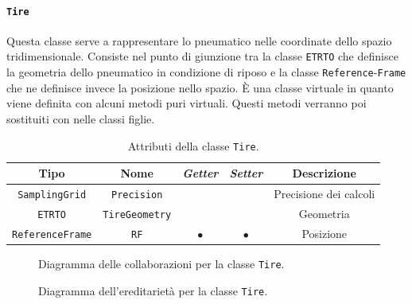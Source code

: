 \paragraph{\texttt{Tire}}
Questa classe serve a rappresentare lo pneumatico nelle coordinate dello spazio tridimensionale. Consiste nel punto di giunzione tra la classe \texttt{ETRTO} che definisce la geometria dello pneumatico in condizione di riposo e la classe \texttt{Reference}-\texttt{Frame} che ne definisce invece la posizione nello spazio. È una classe virtuale in quanto viene definita con alcuni metodi puri virtuali. Questi metodi verranno poi sostituiti con nelle classi figlie.
%
\begin{table}[h!]
	\centering
	\begin{tabular}{|c|c|c|c|c|}
		\hline 
		\textbf{Tipo} & \textbf{Nome} & \textit{\textbf{Getter}} & \textit{\textbf{Setter}} & \textbf{Descrizione} \\ \hline 
		\texttt{SamplingGrid} & \texttt{Precision} & & & Precisione dei calcoli \\ \hline 
		\texttt{ETRTO} & \texttt{TireGeometry} & & & Geometria \\ \hline 
		\texttt{ReferenceFrame} & \texttt{RF} & $\bullet$ & $\bullet$ & Posizione \\ \hline
	\end{tabular}
	\caption{Attributi della classe \texttt{Tire}.}
	\label{}
\end{table}
%
\begin{figure}[h!]
	\centering
	\caption{Diagramma delle collaborazioni per la classe \texttt{Tire}.}
\end{figure}
\begin{figure}[h!]
	\centering
	\caption{Diagramma dell'ereditarietà per la classe \texttt{Tire}.}
\end{figure}
%
